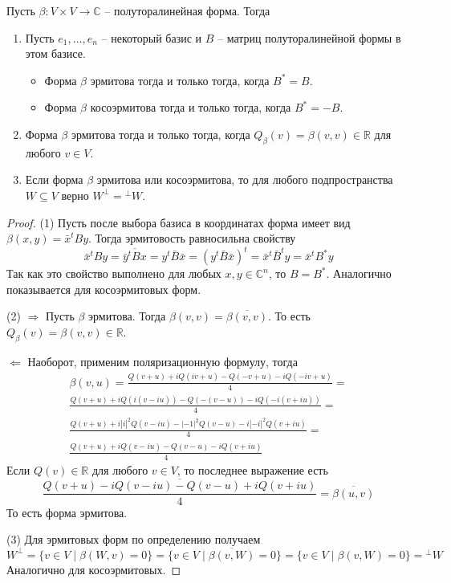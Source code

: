 \begin{claim}
\label{claim::CSymBil}
Пусть $\beta\colon V\times V\to \mathbb C$ -- полуторалинейная форма.
Тогда
\begin{enumerate}
\item Пусть $e_1,\ldots,e_n$ -- некоторый базис и $B$ -- матриц полуторалинейной формы в этом базисе.
\begin{itemize}
\item Форма $\beta$ эрмитова тогда и только тогда, когда $B^* = B$.

\item Форма $\beta$ косоэрмитова тогда и только тогда, когда $B^* = - B$.
\end{itemize}

\item Форма $\beta$ эрмитова тогда и только тогда, когда $Q_\beta(v) = \beta(v,v)\in\mathbb R$ для любого $v\in V$.

\item Если форма $\beta$ эрмитова или косоэрмитова, то для любого подпространства $W\subseteq V$ верно $W^\bot = {}^\bot W$.
\end{enumerate}
\end{claim}
\begin{proof}
(1) Пусть после выбора базиса в координатах форма имеет вид $\beta(x, y) = \bar x^t B y$.
Тогда эрмитовость равносильна свойству
\[
\bar x^t B y = \overline{\bar y^t B x} = y^t \bar B \bar x = (y^t \bar B \bar x)^t = \bar x^t \bar B^t y = \bar x^t B^* y
\]
Так как это свойство выполнено для любых $x,y\in \mathbb C^n$, то $B = B^*$.
Аналогично показывается для косоэрмитовых форм.

(2) $\Rightarrow$ Пусть $\beta$ эрмитова.
Тогда $\beta(v,v) = \overline{\beta(v,v)}$.
То есть $Q_\beta(v) = \beta(v,v)\in \mathbb R$.

$\Leftarrow$ Наоборот, применим поляризационную формулу, тогда
\begin{gather*}
\beta(v,u) = \frac{Q(v+u) + iQ(iv+u) - Q(-v+u) - iQ(-iv+u)}{4}=\\
\frac{Q(v+u) + iQ(i(v-iu)) - Q(-(v-u)) - iQ(-i(v+iu))}{4}=\\
\frac{Q(v+u) + i|i|^2Q(v-iu) -|-1|^2 Q(v-u) - i|-i|^2Q(v+iu)}{4}=\\
\frac{Q(v+u) + iQ(v-iu) - Q(v-u) - iQ(v+iu)}{4}
\end{gather*}
Если $Q(v)\in \mathbb R$ для любого $v\in V$, то последнее выражение есть
\[
\overline{\frac{Q(v+u) - iQ(v-iu) - Q(v-u) + iQ(v+iu)}{4}} = \overline{\beta(u,v)}
\]
То есть форма эрмитова.

(3) Для эрмитовых форм по определению получаем
\[
W^\bot = \{v\in V\mid \beta(W, v) = 0\} = \{v\in V\mid \overline{\beta(v, W)} = 0\} = \{v\in V\mid \beta(v, W) = 0\} = {}^\bot W
\]
Аналогично для косоэрмитовых.
\end{proof}

